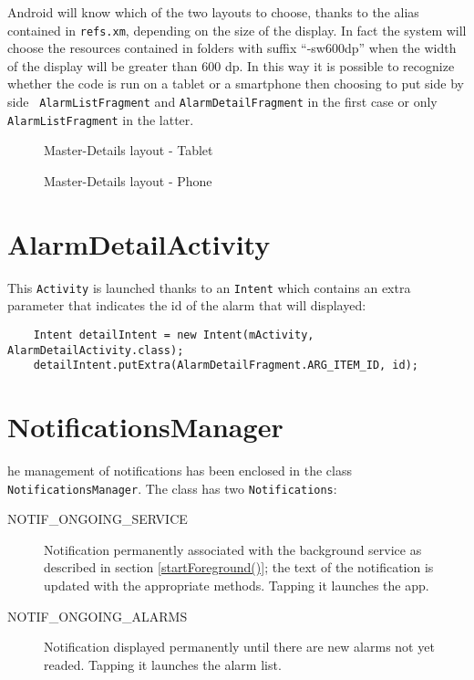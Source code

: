 	Android will know which of the two layouts to choose, thanks to the alias contained in {\tt refs.xm}, depending on the size of the display. In fact the system will choose the resources contained in folders with suffix ``-sw600dp'' when the width of the display will be greater than 600 dp. 
	In this way it is possible to recognize whether the code is run on a tablet or a smartphone then choosing to put side by side {\tt 
	AlarmListFragment} and {\tt AlarmDetailFragment} in the first case or only {\tt AlarmListFragment} in the latter.

		\begin{figure}[h!]
		  \centering
		  \caption{Master-Details layout - Tablet}
		\end{figure}

		\begin{figure}[h!]
		  \centering
		  \caption{Master-Details layout - Phone}
		\end{figure}


	\newpage
	\section{AlarmDetailActivity}
	This {\tt Activity} is launched thanks to an {\tt Intent} which contains an extra parameter that indicates the id of the alarm that will displayed:

		\begin{lstlisting}
    Intent detailIntent = new Intent(mActivity, AlarmDetailActivity.class);
    detailIntent.putExtra(AlarmDetailFragment.ARG_ITEM_ID, id);
		\end{lstlisting}




	\section{NotificationsManager}
	he management of notifications has been enclosed in the class {\tt NotificationsManager}. The class has two {\tt Notifications}:

		\begin{description}

			\item[NOTIF\_ONGOING\_SERVICE] Notification permanently associated with the background service as described in section \ref{startForeground()}; the text of the notification is updated with the appropriate methods. Tapping it launches the app.

			\item[NOTIF\_ONGOING\_ALARMS] Notification displayed permanently until there are new alarms not yet readed. Tapping it launches the alarm list.

		\end{description}




